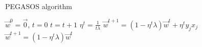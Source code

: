 \begin{frame}{PEGASOS algorithm}
\begin{algorithm}[H]
\begin{algorithmic}[1]
\STATE $\vec{w}^0 = \vec{0}$, $t=0$
\STATE $t=t+1$
\STATE $\eta^t=\frac{1}{t\lambda}$
\STATE $\vec{w}^{t+1}=(1-\eta^t\lambda)\vec{w}^t+\eta^ty_jx_j$
\ELSE
\STATE $\vec{w}^{t+1}=(1-\eta^t\lambda)\vec{w}^t$
\ENDIF
\ENDFOR
\ENDFOR
\end{algorithmic}
\caption{PEGASOS}
\label{alg:pegasos_train}
\end{algorithm}
\end{frame}